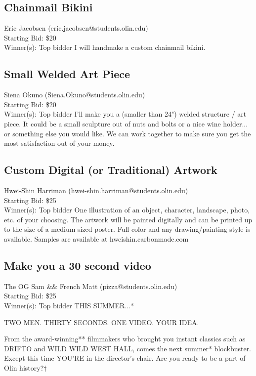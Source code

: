 \documentclass[11pt]{article}
\begin{document}
\subsection{Chainmail Bikini}
Eric Jacobsen (eric.jacobsen@students.olin.edu) \\
Starting Bid: \$20 \\
Winner(s): 
Top bidder\newline
I will handmake a custom chainmail bikini.
\subsection{Small Welded Art Piece}
Siena Okuno (Siena.Okuno@students.olin.edu) \\
Starting Bid: \$20 \\
Winner(s): 
Top bidder\newline
I'll make you a (smaller than 24") welded structure / art piece. It could be a small sculpture out of nuts and bolts or a nice wine holder... or something else you would like. We can work together to make sure you get the most satisfaction out of your money.
\subsection{Custom Digital (or Traditional) Artwork}
Hwei-Shin Harriman (hwei-shin.harriman@students.olin.edu) \\
Starting Bid: \$25 \\
Winner(s): 
Top bidder\newline
One illustration of an object, character, landscape, photo, etc. of your choosing. The artwork will be painted digitally and can be printed up to the size of a medium-sized poster. Full color and any drawing/painting style is available. Samples are available at hweishin.carbonmade.com
\subsection{Make you a 30 second video}
The OG Sam \&\& French Matt (pizza@students.olin.edu) \\
Starting Bid: \$25 \\
Winner(s): 
Top bidder\newline
THIS SUMMER...*

TWO MEN.
THIRTY SECONDS.
ONE VIDEO.
YOUR IDEA.

From the award-winning** filmmakers who brought you instant classics such as DRIFTO and WILD WILD WEST HALL, comes the next summer* blockbuster. Except this time YOU'RE in the director's chair. Are you ready to be a part of Olin history?†
\end{document}
